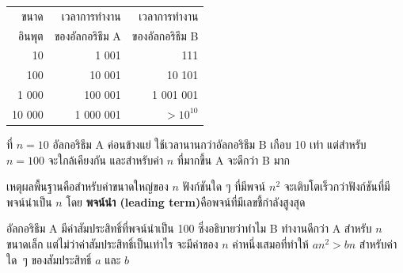 \begin{tabular}{|r|r|r|}
\hline
ขนาด     &   เวลาการทำงาน     		& เวลาการทำงาน \\
อินพุต     &   ของอัลกอริธึม A		& ของอัลกอริธึม B \\
\hline
10        &   1 001           & 111         \\
100       &   10 001          & 10 101         \\
1 000     &   100 001         & 1 001 001         \\
10 000    &   1 000 001       & {\scriptsize$> 10^{10}$}         \\
\hline
\end{tabular}


ที่ {\scriptsize$n=10$} อัลกอริธึม A ค่อนข้างแย่ ใช้เวลานานกว่าอัลกอริธึม B เกือบ 10 เท่า แต่สำหรับ {\scriptsize$n=100$} จะใกล้เคียงกัน และสำหรับค่า {\scriptsize$n$} ที่มากขึ้น A จะดีกว่า B มาก



เหตุผลพื้นฐานคือสำหรับค่าขนาดใหญ่ของ {\scriptsize$n$} ฟังก์ชันใด ๆ ที่มีพจน์ {\scriptsize$n^2$} จะเติบโตเร็วกว่าฟังก์ชันที่มีพจน์นำเป็น {\scriptsize$n$} 
โดย {\bf พจน์นำ (leading term)}คือพจน์ที่มีเลขชี้กำลังสูงสุด


อัลกอริธึม A 
มีค่าสัมประสิทธิ์ที่พจน์นำเป็น 100
ซึ่งอธิบายว่าทำไม B ทำงานดีกว่า A สำหรับ {\scriptsize$n$} ขนาดเล็ก
แต่ไม่ว่าค่าสัมประสิทธิ์เป็นเท่าไร
จะมีค่าของ {\scriptsize$n$} ค่าหนึ่งเสมอที่ทำให้
{\scriptsize$a n^2 > b n$} สำหรับค่าใด~ๆ ของสัมประสิทธิ์ {\scriptsize$a$} และ {\scriptsize$b$}


